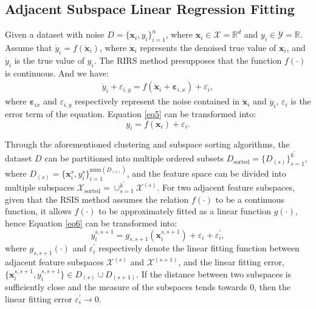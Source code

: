 \documentclass[lettersize,journal]{IEEEtran}
\begin{document}
\subsection{Adjacent Subspace Linear Regression Fitting}
Given a dataset with noise $D=\{\boldsymbol{x}_i,y_i\}_{i=1}^n$, 
where $\boldsymbol{x}_i\in \mathcal{X}=\mathbb{R}^d$ and 
$y_i\in\mathcal{Y}=\mathbb{R}$. Assume that 
$\dot{y}_i=f(\dot{\boldsymbol{x}}_i)$, where 
$\dot{\boldsymbol{x}}_i$ represents the denoised true value of 
$\boldsymbol{x}_i$, and $\dot{y}_i$ is the true value of 
$y_i$. The RIRS method presupposes that the function $f(\cdot)$ 
is continuous. And we have:
\begin{align} 
\label{eq5}
\dot{y}_i+\varepsilon_{i,y}=f(\dot{\boldsymbol{x}}_i+
\boldsymbol{\varepsilon}_{i,x})+\varepsilon_i, 
\end{align}
where $\boldsymbol{\varepsilon}_{ix}$ and $\varepsilon_{i,y}$ 
respectively represent the noise contained in 
$\dot{\boldsymbol{x}}_i$ and $\dot{y}_i$, $\varepsilon_i$ is the 
error term of the equation. Equation \eqref{eq5} can be transformed into:
\begin{equation} 
\label{eq6}
y_i=f(\boldsymbol{x}_i)+\varepsilon_i. 
\end{equation}

Through the aforementioned clustering and subspace sorting 
algorithms, the dataset $D$ can be partitioned into multiple 
ordered subsets $D_{\text{sorted}}=\{D_{(s)}\}_{s=1}^{k^\prime}$, 
where $D_{(s)}=\{ \boldsymbol{x}_i^s,y_i^s \}_{i=1}^{\text{num}
(D_{(s)})}$, and the feature space can be divided into multiple 
subspaces $\mathcal{X}_{\text{sorted}}=\cup_{s=1}^{k^\prime}\mathcal{X}^{(s)}$. For 
two adjacent feature subspaces, given that the RSIS method assumes 
the relation $f(\cdot)$ to be a continuous function, it allows 
$f(\cdot)$ to be approximately fitted as a linear function 
$g(\cdot)$, hence Equation \eqref{eq6} can be transformed into: 
\begin{equation} 
\label{eq7}
y_i^{s,s+1}=g_{s,s+1}(\boldsymbol{x}_i^{s,s+1})+\varepsilon_i+
\varepsilon_i^\prime, 
\end{equation}
where $g_{s,s+1}(\cdot)$ and $\varepsilon_i^\prime$ respectively 
denote the linear fitting function between adjacent feature 
subspaces $\mathcal{X}^{(s)}$ and $\mathcal{X}^{(s+1)}$, and the linear 
fitting error, $\{\boldsymbol{x}_i^{s,s+1},y_i^{s,s+1}\}\in D_{(s)}\cup 
D_{(s+1)}$. If the distance between two subspaces is sufficiently 
close and the measure of the subspaces tends towards $0$, then the 
linear fitting error $\varepsilon_i^\prime\rightarrow0$.
\end{document}
